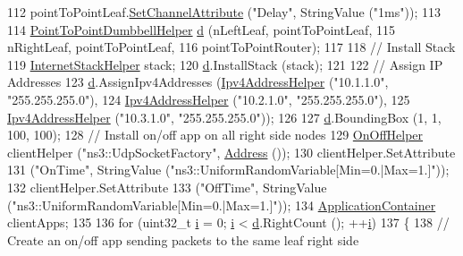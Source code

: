 \begin{DoxyCode}
112   pointToPointLeaf.\hyperlink{classns3_1_1PointToPointHelper_a6b5317fd17fb61e5a53f8d66a90b63b9}{SetChannelAttribute}   (\textcolor{stringliteral}{"Delay"}, StringValue (\textcolor{stringliteral}{"1ms"}));
113 
114   \hyperlink{classns3_1_1PointToPointDumbbellHelper}{PointToPointDumbbellHelper} \hyperlink{buildings__pathloss_8m_a9f9b934daed17a4d3613b6886ff4cf4b}{d} (nLeftLeaf, pointToPointLeaf,
115                                 nRightLeaf, pointToPointLeaf,
116                                 pointToPointRouter);
117 
118   \textcolor{comment}{// Install Stack}
119   \hyperlink{classns3_1_1InternetStackHelper}{InternetStackHelper} stack;
120   \hyperlink{buildings__pathloss_8m_a9f9b934daed17a4d3613b6886ff4cf4b}{d}.InstallStack (stack);
121 
122   \textcolor{comment}{// Assign IP Addresses}
123   \hyperlink{buildings__pathloss_8m_a9f9b934daed17a4d3613b6886ff4cf4b}{d}.AssignIpv4Addresses (\hyperlink{classns3_1_1Ipv4AddressHelper}{Ipv4AddressHelper} (\textcolor{stringliteral}{"10.1.1.0"}, \textcolor{stringliteral}{"255.255.255.0"}),
124                          \hyperlink{classns3_1_1Ipv4AddressHelper}{Ipv4AddressHelper} (\textcolor{stringliteral}{"10.2.1.0"}, \textcolor{stringliteral}{"255.255.255.0"}),
125                          \hyperlink{classns3_1_1Ipv4AddressHelper}{Ipv4AddressHelper} (\textcolor{stringliteral}{"10.3.1.0"}, \textcolor{stringliteral}{"255.255.255.0"}));
126 
127   \hyperlink{buildings__pathloss_8m_a9f9b934daed17a4d3613b6886ff4cf4b}{d}.BoundingBox (1, 1, 100, 100);
128   \textcolor{comment}{// Install on/off app on all right side nodes}
129   \hyperlink{classns3_1_1OnOffHelper}{OnOffHelper} clientHelper (\textcolor{stringliteral}{"ns3::UdpSocketFactory"}, \hyperlink{classns3_1_1Address}{Address} ());
130   clientHelper.SetAttribute 
131     (\textcolor{stringliteral}{"OnTime"}, StringValue (\textcolor{stringliteral}{"ns3::UniformRandomVariable[Min=0.|Max=1.]"}));
132   clientHelper.SetAttribute 
133     (\textcolor{stringliteral}{"OffTime"}, StringValue (\textcolor{stringliteral}{"ns3::UniformRandomVariable[Min=0.|Max=1.]"}));
134   \hyperlink{classns3_1_1ApplicationContainer}{ApplicationContainer} clientApps;
135 
136   \textcolor{keywordflow}{for} (uint32\_t \hyperlink{bernuolliDistribution_8m_a6f6ccfcf58b31cb6412107d9d5281426}{i} = 0; \hyperlink{bernuolliDistribution_8m_a6f6ccfcf58b31cb6412107d9d5281426}{i} < \hyperlink{buildings__pathloss_8m_a9f9b934daed17a4d3613b6886ff4cf4b}{d}.RightCount (); ++\hyperlink{bernuolliDistribution_8m_a6f6ccfcf58b31cb6412107d9d5281426}{i})
137     \{
138       \textcolor{comment}{// Create an on/off app sending packets to the same leaf right side}

\end{DoxyCode}
